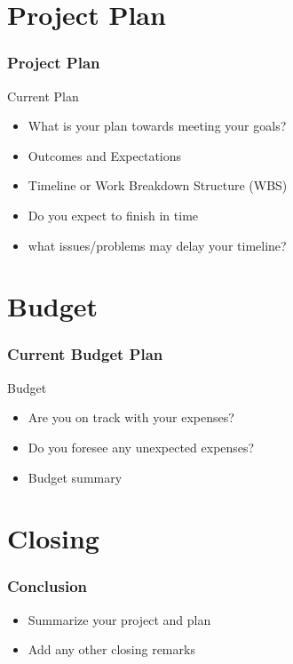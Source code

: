 \documentclass[11pt]{beamer}
\begin{document}
\section{Project Plan}
\begin{frame}
\frametitle{Project Plan}
\begin{block}{Current Plan}
\begin{itemize}
\item What is your plan towards meeting your goals?
\item Outcomes and Expectations
\item Timeline or Work Breakdown Structure (WBS)
\item Do you expect to finish in time
\item what issues/problems may delay your timeline?

\end{itemize}
\end{block}
\end{frame}

\section{Budget}
\begin{frame}
\frametitle{Current Budget Plan}
\begin{block}{Budget}
\begin{itemize}
\item Are you on track with your expenses?
\item Do you foresee any unexpected expenses?
\item Budget summary
\end{itemize}

\end{block}
\end{frame}

\section{Closing}
\begin{frame}
\frametitle{Conclusion}
\begin{itemize}
\item Summarize your project and plan
\item Add any other closing remarks
\end{itemize}
\end{frame}
\end{document}
